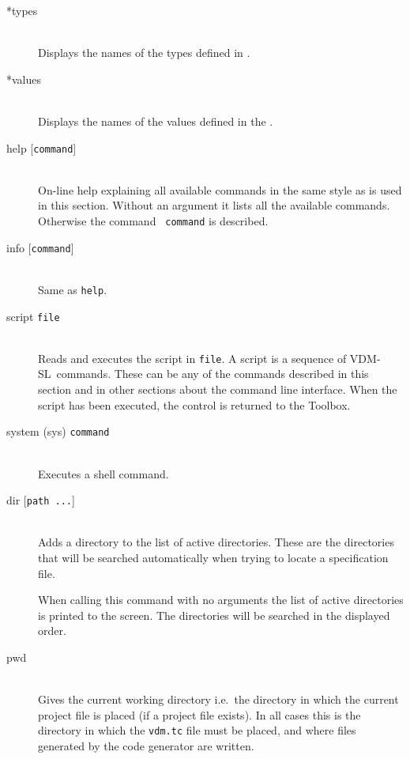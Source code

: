 \documentclass[\pformat,12pt]{article}
\newcommand{\vdmslpp}{VDM-SL}
\newcommand{\Toolbox}{Toolbox}
\newcommand{\vdmslpp}{VDM++}
\newcommand{\Toolbox}{Toolbox}
\begin{document}
\begin{description}
\item[*types] \mbox{}\\ 
  Displays the names of the types defined in
  .

\item[*values] \mbox{}\\ 
  Displays the names of the values defined in the 
  .

\item[help \mbox{[{\tt command}]}] \mbox{}\\
  On-line help explaining all available commands in
  the same style as is used in this section. Without an argument it
  lists all the available commands. Otherwise the command {\tt
    command} is described.

\item[info \mbox{[{\tt command}]}] \mbox{}\\
  Same as {\tt help}.

\item[script {\tt file}] \mbox{}\\
  Reads and executes the script in {\tt file}.  A script is a
  sequence of \vdmslpp\ commands.  These can be any of the commands
  described in this section and in other sections about the
  command line interface.  When the script has been executed, the
  control is returned to the \Toolbox.

\item[system (sys) {\tt command}]\mbox{}\\
  Executes a shell command.

\item[dir \mbox{[{\tt path ...}]}] \mbox{}\\
  Adds a directory to the list of active directories. These are the
  directories that will be searched automatically when trying to
  locate a specification file.
  
  When calling this command with no arguments the list of active
  directories is printed to the screen. The directories will be
  searched in the displayed order.

\item[pwd]  \mbox{}\\
  Gives the current working directory i.e.\ the directory in which
  the current project file is placed (if a project file exists). In
  all cases this is the directory in which the \texttt{vdm.tc} file must
  be placed, and where files generated by the code generator
   are written.


\end{description}
\end{document}
